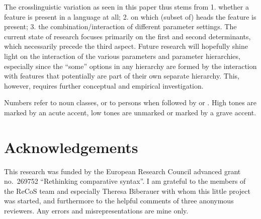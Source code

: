 \documentclass[output=paper]{langsci/langscibook}
\begin{document}
The crosslinguistic variation as seen in this paper thus stems from 1. whether
a feature is present in a language at all; 2. on which (subset of) heads the
feature is present; 3. the combination/interaction of different parameter
settings. The current state of research focuses primarily on the first and
second determinants, which necessarily precede the third aspect. Future
research will hopefully shine light on the interaction of the various
parameters and parameter hierarchies, especially since the \enquote{some} options in
any hierarchy are formed by the interaction with features that potentially are
part of their own separate hierarchy. This, however, requires further
conceptual and empirical investigation.

\printchapterglossary{}

\noindent Numbers refer to noun classes, or to persons when followed by \Sg{}
or \Pl{}.  High tones are marked by an acute accent, low tones are unmarked or
marked by a grave accent.

\section*{Acknowledgements}

This research was funded by the European Research Council advanced grant no.\
269752 \enquote{Rethinking comparative syntax}. I am grateful to the members of
the ReCoS team and especially Theresa Biberauer with whom this little project
was started, and furthermore to the helpful comments of three anonymous
reviewers.  Any errors and misrepresentations are mine only.

{\sloppy\printbibliography[heading=subbibliography,notkeyword=this]}
\end{document}
